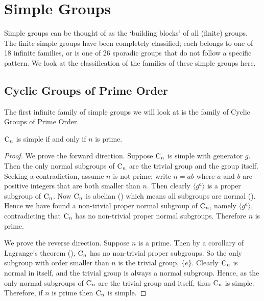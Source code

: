 \chapter{Simple Groups}
Simple groups can be thought of as the `building blocks' of all (finite) groups. The finite simple groups have been completely classified; each belongs to one of 18 infinite families, or is one of 26 sporadic groups that do not follow a specific pattern. We look at the classification of the families of these simple groups here.

\section{Cyclic Groups of Prime Order}
The first infinite family of simple groups we will look at is the family of Cyclic Groups of Prime Order.

\begin{lemma}\label{lemma-cyclic-group-simple-iff-order-is-prime}
    $\mathrm{C}_{n}$ is simple if and only if $n$ is prime.
\end{lemma}
\begin{proof}
    We prove the forward direction. Suppose $\mathrm{C}_{n}$ is simple with generator $g$. Then the only normal subgroups of $\mathrm{C}_{n}$ are the trivial group and the group itself. Seeking a contradiction, assume $n$ is not prime; write $n = ab$ where $a$ and $b$ are positive integers that are both smaller than $n$. Then clearly $\langle g^a\rangle$ is a proper subgroup of $\mathrm{C}_{n}$. Now $\mathrm{C}_{n}$ is abelian () which means all subgroups are normal (). Hence we have found a non-trivial proper normal subgroup of $\mathrm{C}_{n}$, namely $\langle g^a \rangle$, contradicting that $\mathrm{C}_{n}$ has no non-trivial proper normal subgroups. Therefore $n$ is prime.

    We prove the reverse direction. Suppose $n$ is a prime. Then by a corollary of Lagrange's theorem (), $\mathrm{C}_{n}$ has no non-trivial proper subgroups. So the only subgroup with order smaller than $n$ is the trivial group, $\{e\}$. Clearly $\mathrm{C}_{n}$ is normal in itself, and the trivial group is always a normal subgroup. Hence, as the only normal subgroups of $\mathrm{C}_{n}$ are the trivial group and itself, thus $\mathrm{C}_{n}$ is simple. Therefore, if $n$ is prime then $\mathrm{C}_{n}$ is simple.
\end{proof}

